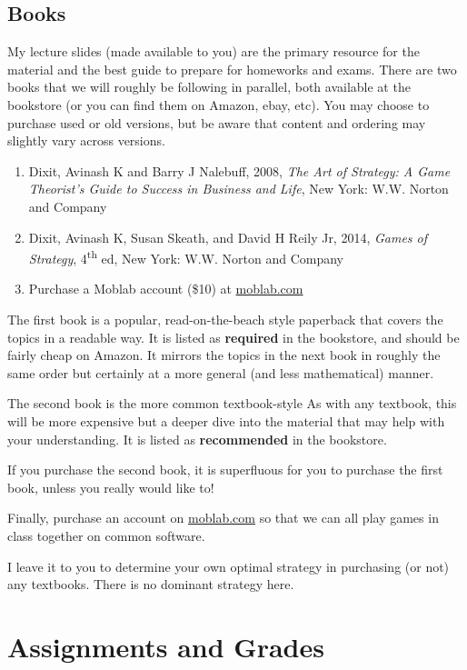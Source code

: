 \documentclass{article}
\providecommand{\tightlist}{%
  \setlength{\itemsep}{0pt}\setlength{\parskip}{0pt}}
\begin{document}
\hypertarget{books}{%
\subsection{Books}\label{books}}

My lecture slides (made available to you) are the primary resource for
the material and the best guide to prepare for homeworks and exams.
There are two books that we will roughly be following in parallel, both
available at the bookstore (or you can find them on Amazon, ebay, etc).
You may choose to purchase used or old versions, but be aware that
content and ordering may slightly vary across versions.

\begin{enumerate}
\def\labelenumi{\arabic{enumi}.}
\tightlist
\item
  Dixit, Avinash K and Barry J Nalebuff, 2008, \emph{The Art of
  Strategy: A Game Theorist's Guide to Success in Business and Life},
  New York: W.W. Norton and Company
\item
  Dixit, Avinash K, Susan Skeath, and David H Reily Jr, 2014,
  \emph{Games of Strategy}, 4\textsuperscript{th} ed, New York: W.W.
  Norton and Company
\item
  Purchase a Moblab account (\$10) at
  \href{http://moblab.com}{moblab.com}
\end{enumerate}

The first book is a popular, read-on-the-beach style paperback that
covers the topics in a readable way. It is listed as \textbf{required}
in the bookstore, and should be fairly cheap on Amazon. It mirrors the
topics in the next book in roughly the same order but certainly at a
more general (and less mathematical) manner.

The second book is the more common textbook-style As with any textbook,
this will be more expensive but a deeper dive into the material that may
help with your understanding. It is listed as \textbf{recommended} in
the bookstore.

If you purchase the second book, it is superfluous for you to purchase
the first book, unless you really would like to!

Finally, purchase an account on \href{https://moblab.com}{moblab.com} so
that we can all play games in class together on common software.

I leave it to you to determine your own optimal strategy in purchasing
(or not) any textbooks. There is no dominant strategy here.

\hypertarget{assignments-and-grades}{%
\section{Assignments and Grades}\label{assignments-and-grades}}
\end{document}
